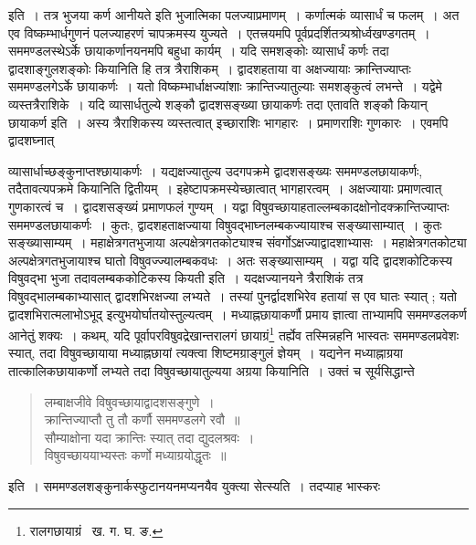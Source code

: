 \documentclass[11pt, openany]{book}
\begin{document}
\noindent इति~। तत्र भुजया कर्ण आनीयते इति भुजात्मिका पलज्याप्रमाणम्~। कर्णात्मकं व्यासार्धं च फलम्~। अत एव विष्कम्भार्धगुणनं पलज्याहरणं चापक्रमस्य युज्यते~। एतत्त्रयमपि पूर्वप्रदर्शितत्र्यश्रोर्ध्वखण्डगतम्~। सममण्डलस्थेऽर्के छायाकर्णानयनमपि बहुधा कार्यम्~। यदि समशङ्कोः व्यासार्धं कर्णः तदा द्वादशाङ्गुलशङ्कोः कियानिति हि तत्र त्रैराशिकम्~। द्वादशहताया वा अक्षज्यायाः क्रान्तिज्याप्तः सममण्डलगेऽर्के छायाकर्णः~। यतो विष्कम्भार्धाक्षज्यांशाः क्रान्तिज्यातुल्याः समशङ्कुत्वं लभन्ते~। यद्वेमे व्यस्तत्रैराशिके~। यदि व्यासार्धतुल्ये शङ्कौ द्वादशसङ्ख्या छायाकर्णः तदा एतावति शङ्कौ कियान् छायाकर्ण इति~। अस्य त्रैराशिकस्य व्यस्तत्वात् इच्छाराशिः भागहारः~। प्रमाणराशिः गुणकारः~। एवमपि द्वादशघ्नात् 

\newpage

\noindent व्यासार्धाच्छङ्कुनाप्तश्छायाकर्णः~। यद्यक्षज्यातुल्य उदगपक्रमे द्वादशसङ्ख्यः सममण्डलछायाकर्णः, तदैतावत्यपक्रमे कियानिति द्वितीयम्~। इहेष्टापक्रमस्येच्छात्वात् भागहारत्वम्~। अक्षज्यायाः प्रमाणत्वात् गुणकारत्वं च~। द्वादशसङ्ख्यं प्रमाणफलं गुण्यम्~। यद्वा विषुवच्छायाहताल्लम्बकादक्षोनोदक्क्रान्तिज्याप्तः सममण्डलछायाकर्णः~। कुतः, द्वादशहताक्षज्याया विषुवद्भाघ्नलम्बकज्यायाश्च सङ्ख्यासाम्यात्~। कुतः सङ्ख्यासाम्यम्~। महाक्षेत्रगतभुजाया अल्पक्षेत्रगतकोट्याश्च संवर्गोऽक्षज्याद्वादशाभ्यासः~। महाक्षेत्रगतकोट्या अल्पक्षेत्रगतभुजायाश्च घातो विषुवज्ज्यालम्बकवधः~। अतः सङ्ख्यासाम्यम्~। यद्वा यदि द्वादशकोटिकस्य विषुवद्भा भुजा 
तदावलम्बककोटिकस्य कियती इति~। यदक्षज्यानयने त्रैराशिकं तत्र विषुवद्भालम्बकाभ्यासात् द्वादशभिरक्षज्या लभ्यते~। तस्यां पुनर्द्वादशभिरेव हतायां स एव घातः स्यात् ; यतो द्वादशभिरात्मलाभोऽभूद् इत्युभयोर्घातयोस्तुल्यत्वम्~। मध्याह्नछायाकर्णौ प्रमाय ज्ञात्वा ताभ्यामपि सममण्डलकर्ण आनेतुं शक्यः~। कथम्, यदि पूर्वापरविषुवद्रेखान्तरालगं छायाग्रं\renewcommand{\thefootnote}{१}\footnote{रालगछायाग्रं \textendash\ ख. ग. घ. ङ.} तर्ह्येव तस्मिन्नहनि भास्वतः सममण्डलप्रवेशः स्यात्, तदा विषुवच्छायाया मध्याह्नछायां त्यक्त्वा शिष्टमग्राङ्गुलं ज्ञेयम्~। यद्यनेन मध्याह्नाग्रया तात्कालिकछायाकर्णो लभ्यते तदा विषुवच्छायातुल्यया अग्रया कियानिति~। उक्तं च सूर्यसिद्धान्ते\textendash  
\begin{quote}
{\qt लम्बाक्षजीवे विषुवच्छायाद्वादशसङ्गुणे~। \\
क्रान्तिज्याप्तौ तु तौ कर्णौ सममण्डलगे रवौ~॥ \\
सौम्याक्षोना यदा क्रान्तिः स्यात् तदा द्युदलश्रवः~। \\
विषुवच्छाययाभ्यस्तः कर्णो मध्याग्रयोद्धृतः~॥  }
\end{quote}

\noindent इति~। सममण्डलशङ्कुनार्कस्फुटानयनमप्यनयैव युक्त्या सेत्स्यति~। तदप्याह भास्करः\textendash  
\end{document}
